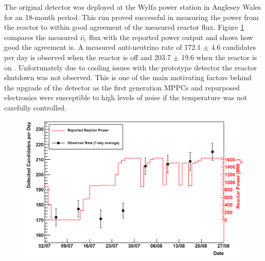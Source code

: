 The original detector was deployed at the Wylfa power station in Anglesey Wales for an 18-month period. This run proved successful in measuring the power from the reactor to within good agreement of the measured reactor flux. Figure \ref{fig:prototypeMeasumentFlux} compares the measured $\bar{\nu_e}$ flux with the reported power output and shows how good the agreement is. A measured anti-neutrino rate of 172.1 $\pm$ 4.6 candidates per day is observed when the reactor is off and 203.7 $\pm$ 19.6 when the reactor is on \cite{Carroll_2018}. Unfortunately due to cooling issues with the prototype detector the reactor shutdown was not observed. This is one of the main motivating factors behind the upgrade of the detector as the first generation MPPCs and repurposed electronics were susceptible to high levels of noise if the temperature was not carefully controlled. 
\begin{figure}[!h]
 \centering
 \includegraphics[width=0.7\linewidth]{Chapter2/Figs/Raster/prototypeMeasureOnFig.png} 
 \label{fig:prototypeMeasumentFlux}
\end{figure}

